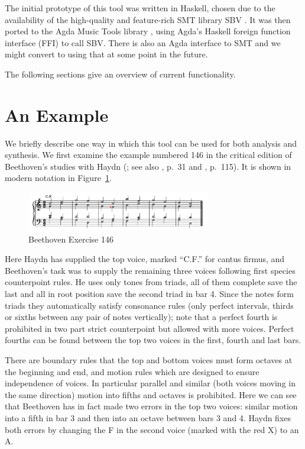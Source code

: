 \documentclass[sigplan,screen]{acmart}
\begin{document}
The initial prototype \citep{HaskellCounterpoint} of this tool was
written in Haskell, chosen due to the availability of the
high-quality and feature-rich SMT library SBV \citep{SBV}. It was then
ported to the Agda Music Tools library \cite{MusicTools}, using Agda's
Haskell foreign function interface (FFI) to call SBV. There is also an
Agda interface \citep{Schmitty} to SMT and we might convert to using
that at some point in the future.

The following sections give an overview of current
functionality. 

\section{An Example}

We briefly describe one way in which this tool can be used for both
analysis and synthesis. We first examine the example numbered 146 in
the critical edition of Beethoven's studies with Haydn
(\cite{BeethovenWerke13}; see also \cite{Nottebohm1971}, p.\ 31 and
\cite{Mann1987}, p.\ 115). It is shown in modern notation in
Figure~\ref{fig:b146}.

\begin{figure}
  \includegraphics[width=8cm]{figures/b146.png}
  \caption{Beethoven Exercise 146}
  \label{fig:b146}
\end{figure}

Here Haydn has supplied the top voice, marked ``C.F.'' for cantus
firmus, and Beethoven's task was to supply the remaining three voices
following first species counterpoint rules. He uses only tones from
triads, all of them complete save the last and all in root position
save the second triad in bar 4. Since the notes form triads they
automatically satisfy consonance rules (only perfect intervals, thirds
or sixths between any pair of notes vertically); note that a perfect
fourth is prohibited in two part strict counterpoint but allowed with
more voices. Perfect fourths can be found between the top two voices
in the first, fourth and last bars.

There are boundary rules that the top and bottom voices must form
octaves at the beginning and end, and motion rules which are designed
to ensure independence of voices. In particular parallel and similar
(both voices moving in the same direction) motion into fifths and
octaves is prohibited. Here we can see that Beethoven has in fact made
two errors in the top two voices: similar motion into a fifth in bar 3
and then into an octave between bars 3 and 4. Haydn fixes both errors
by changing the F in the second voice (marked with the red X) to an A.
\end{document}
